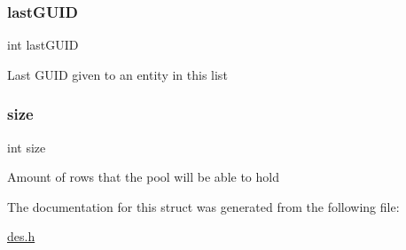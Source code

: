 \subsubsection{\texorpdfstring{last\+G\+U\+ID}{lastGUID}}
{\footnotesize\ttfamily int last\+G\+U\+ID}

Last G\+U\+ID given to an entity in this list \mbox{\label{struct_entity_pool_a439227feff9d7f55384e8780cfc2eb82}} 
\subsubsection{\texorpdfstring{size}{size}}
{\footnotesize\ttfamily int size}

Amount of rows that the pool will be able to hold 

The documentation for this struct was generated from the following file\+:\begin{DoxyCompactItemize}
\item 
\mbox{\hyperlink{des_8h}{des.\+h}}\end{DoxyCompactItemize}
